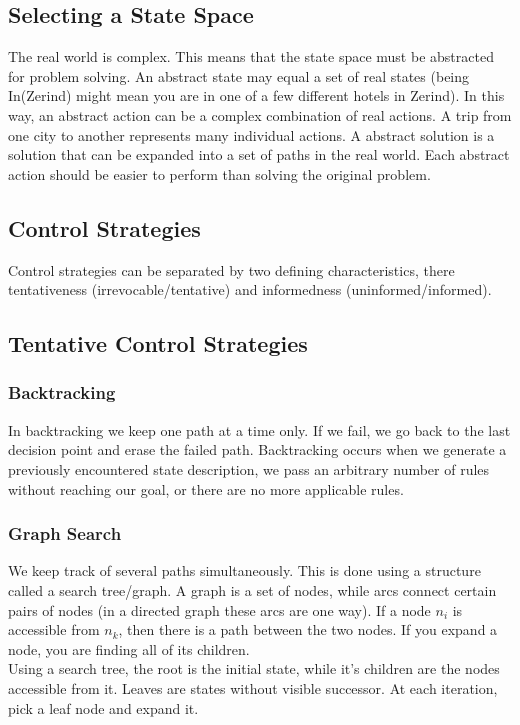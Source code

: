 \documentclass[11pt, oneside]{article}   	%
\begin{document}
\subsection{Selecting a State Space}

The real world is complex. This means that the state space must be abstracted for problem solving. An abstract state may equal a set of real states (being In(Zerind) might mean you are in one of a few different hotels in Zerind). In this way, an abstract action can be a complex combination of real actions. A trip from one city to another represents many individual actions. A abstract solution is a solution that can be expanded into a set of paths in the real world. Each abstract action should be easier to perform than solving the original problem.

\subsection{Control Strategies}
Control strategies can be separated by two defining characteristics, there tentativeness (irrevocable/tentative) and informedness (uninformed/informed).

\subsection{Tentative Control Strategies}
\subsubsection{Backtracking}
In backtracking we keep one path at a time only. If we fail, we go back to the last decision point and erase the failed path. Backtracking occurs when we generate a previously encountered state description, we pass an arbitrary number of rules without reaching our goal, or there are no more applicable rules.
\subsubsection{Graph Search}
We keep track of several paths simultaneously. This is done using a structure called a search tree/graph. A graph is a set of nodes, while arcs connect certain pairs of nodes (in a directed graph these arcs are one way). If a node $n_i$ is accessible from $n_k$, then there is a path between the two nodes. If you expand a node, you are finding all of its children. 
\\
Using a search tree, the root is the initial state, while it's children are the nodes accessible from it. Leaves are states without visible successor. At each iteration, pick a leaf node and expand it.
\end{document}
